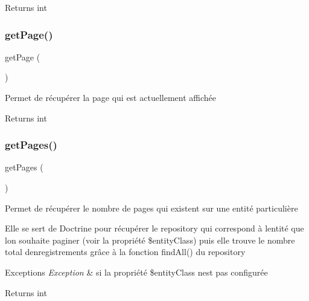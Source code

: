 \begin{DoxyReturn}{Returns}
int 
\end{DoxyReturn}
\mbox{\label{class_app_1_1_service_1_1_pagination_service_a12a549e25239c9219e66322cf6a1be68}} 
\subsubsection{\texorpdfstring{getPage()}{getPage()}}
{\footnotesize\ttfamily get\+Page (\begin{DoxyParamCaption}{ }\end{DoxyParamCaption})}

Permet de récupérer la page qui est actuellement affichée

\begin{DoxyReturn}{Returns}
int 
\end{DoxyReturn}
\mbox{\label{class_app_1_1_service_1_1_pagination_service_a9613a9ee3ec2d3c253b6cacde84fb992}} 
\subsubsection{\texorpdfstring{getPages()}{getPages()}}
{\footnotesize\ttfamily get\+Pages (\begin{DoxyParamCaption}{ }\end{DoxyParamCaption})}

Permet de récupérer le nombre de pages qui existent sur une entité particulière

Elle se sert de Doctrine pour récupérer le repository qui correspond à l\textquotesingle{}entité que l\textquotesingle{}on souhaite paginer (voir la propriété \$entity\+Class) puis elle trouve le nombre total d\textquotesingle{}enregistrements grâce à la fonction find\+All() du repository


\begin{DoxyExceptions}{Exceptions}
{\em Exception} & si la propriété \$entity\+Class n\textquotesingle{}est pas configurée\\
\hline
\end{DoxyExceptions}
\begin{DoxyReturn}{Returns}
int 
\end{DoxyReturn}
\mbox{\label{class_app_1_1_service_1_1_pagination_service_ac01e8ae14a990fb74fc2e8b0fc1bdb63}} 
